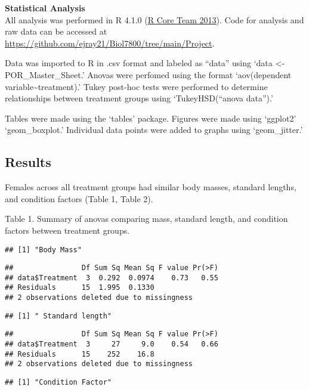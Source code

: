 \documentclass[
  12pt,
]{article}
\begin{document}
\textbf{Statistical Analysis}\\
All analysis was performed in R 4.1.0 (\protect\hyperlink{ref-RN36}{R Core Team 2013}). Code for analysis and raw data can be accessed at \url{https://github.com/ejray21/Biol7800/tree/main/Project}.

Data was imported to R in .csv format and labeled as ``data'' using `data \textless- POR\_Master\_Sheet.' Anovas were perfomed using the format `aov(dependent variable\textasciitilde treatment).' Tukey post-hoc tests were performed to determine relationships between treatment groups using `TukeyHSD(``anova data'').'

Tables were made using the `tables' package. Figures were made using `ggplot2' `geom\_boxplot.' Individual data points were added to graphs using `geom\_jitter.'

\hypertarget{results}{%
\subsection{Results}\label{results}}

Females across all treatment groups had similar body masses, standard lengths, and condition factors (Table 1, Table 2).

Table 1. Summary of anovas comparing mass, standard length, and condition factors between treatment groups.

\begin{verbatim}
## [1] "Body Mass"
\end{verbatim}

\begin{verbatim}
##                Df Sum Sq Mean Sq F value Pr(>F)
## data$Treatment  3  0.292  0.0974    0.73   0.55
## Residuals      15  1.995  0.1330               
## 2 observations deleted due to missingness
\end{verbatim}

\begin{verbatim}
## [1] " Standard length"
\end{verbatim}

\begin{verbatim}
##                Df Sum Sq Mean Sq F value Pr(>F)
## data$Treatment  3     27     9.0    0.54   0.66
## Residuals      15    252    16.8               
## 2 observations deleted due to missingness
\end{verbatim}

\begin{verbatim}
## [1] "Condition Factor"
\end{verbatim}
\end{document}
